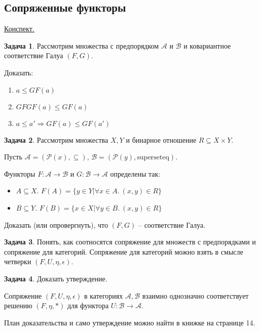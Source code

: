 \documentclass[10pt]{article}
\theoremstyle{definition}
\newtheorem{Pm}{Задача}[subsection]
\begin{document}
\subsection{Сопряженные функторы}
\href{https://drive.google.com/file/d/1kc4Tb_ImVhWP9aFOOLEC75KcX9R62uhI/view?usp=share_link}{\underline{Конспект.}}
\begin{Pm}
    Рассмотрим множества с предпорядком $\mathcal A$ и $\mathcal B$ и ковариантное соответствие Галуа $(F, G)$.

    Доказать:

    \begin{enumerate}
        \item $a \leq GF(a)$
        \item $GFGF(a) \leq GF(a)$
        \item $a \leq a' \Rightarrow GF(a) \leq GF(a')$
    \end{enumerate}
\end{Pm}
\begin{Pm}
    Рассмотрим множества $X, Y$ и бинарное отношение $R \subseteq X \times Y$.

    Пусть $\mathcal A = (\mathcal P(x), \subseteq)$, $\mathcal B = (\mathcal P(y), \text{superseteq})$.

    Функторы $F : \mathcal A \rightarrow \mathcal B$ и $G : \mathcal B \rightarrow \mathcal A$ определены так:
    \begin{itemize}
        \item $A \subseteq X$. $F(A) = \{y \in Y | \forall x \in A. \ (x, y) \in R\}$
        \item $B \subseteq Y$. $F(B) = \{x \in X | \forall y \in B. \ (x, y) \in R\}$
    \end{itemize}

    Доказать (или опровергнуть), что $(F, G)$ -- соответствие Галуа.
\end{Pm}
\begin{Pm}
    Понять, как соотносятся сопряжение для множеств с предпорядками и сопряжение для категорий. Сопряжение для категорий можно взять в смысле четверки $(F, U, \eta, \epsilon)$.
\end{Pm}
\begin{Pm}
    Доказать утверждение.

    Сопряжение $(F, U, \eta, \epsilon)$ в категориях $\mathcal A, \mathcal B$ взаимно однозначно соответствует решению $(F, \eta, *)$ для функтора $U : \mathcal B \rightarrow \mathcal A$.

    План доказательства и само утверждение можно найти в книжке на странице 14.
\end{Pm}
\end{document}
